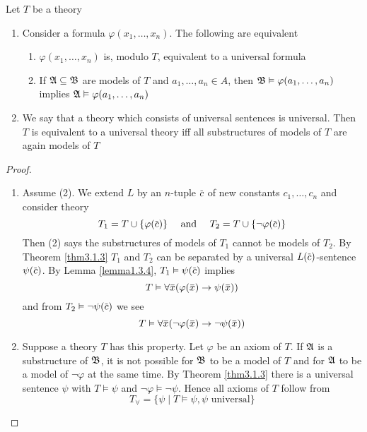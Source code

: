 \documentclass[11pt]{article}
\begin{document}
\begin{corollary}[]
\label{cor3.1.5}
Let \(T\) be a theory
\begin{enumerate}
\item Consider a formula \(\varphi(x_1,\dots,x_n)\). The following are equivalent
\begin{enumerate}
\item \(\varphi(x_1,\dots,x_n)\) is, modulo \(T\), equivalent to a universal formula
\item If \(\mathfrak{A}\subseteq\mathfrak{B}\) are models of \(T\) and \(a_1,\dots,a_n\in A\),
then \(\mathfrak{B}\vDash\varphi(a_1,\dots,a_n)\) implies \(\mathfrak{A}\vDash\varphi(a_1,\dots,a_n)\)
\end{enumerate}
\item We say that a theory which consists of universal sentences is universal.
Then \(T\) is equivalent to a universal theory iff all substructures of
models of \(T\) are again models of \(T\)
\end{enumerate}
\end{corollary}

\begin{proof}
\begin{enumerate}
\item Assume (2). We extend \(L\) by an \(n\)-tuple \(\bbar{c}\) of new
constants \(c_1,\dots,c_n\) and consider theory
\begin{equation*}
T_1=T\cup\{\varphi(\bbar{c})\}\quad\text{ and }\quad
T_2=T\cup\{\neg\varphi(\bbar{c})\}
\end{equation*}
Then (2) says the substructures of models of \(T_1\) cannot be models of
\(T_2\). By Theorem \ref{thm3.1.3} \(T_1\) and \(T_2\) can be separated by a
universal \(L(\bbar{c})\)-sentence \(\psi(\bbar{c})\). By Lemma
\ref{lemma1.3.4}, \(T_1\vDash\psi(\bbar{c})\) implies
\begin{equation*}
T\vDash\forall\bbar{x}(\varphi(\bbar{x})\to\psi(\bbar{x}))
\end{equation*}
and from \(T_2\vDash\neg\psi(\bbar{c})\) we see
\begin{equation*}
T\vDash\forall\bbar{x}(\neg\varphi(\bbar{x})\to\neg\psi(\bbar{x}))
\end{equation*}
\item Suppose a theory \(T\) has this property. Let \(\varphi\) be an axiom of \(T\). If
\(\mathfrak{A}\) is a substructure of \(\mathfrak{B}\), it is not possible for \(\mathfrak{B}\) to be
a model of \(T\) and for \(\mathfrak{A}\) to be a model of \(\neg\varphi\) at the same
time. By Theorem \ref{thm3.1.3} there is a universal sentence \(\psi\) with
\(T\vDash\psi\) and \(\neg\varphi\vDash\neg\psi\). Hence all axioms of
\(T\) follow from
\begin{equation*}
T_\forall=\{\psi\mid T\vDash\psi,\psi\text{ universal}\}
\end{equation*}
\end{enumerate}
\end{proof}
\end{document}
